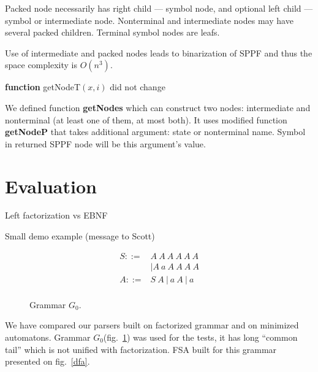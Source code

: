 \documentclass[runningheads,a4paper]{llncs}
\begin{document}
Packed node necessarily has right child --- symbol node, and optional left child --- symbol or intermediate node.
Nonterminal and intermediate nodes may have several packed children. 
Terminal symbol nodes are leafs.

Use of intermediate and packed nodes leads to binarization of SPPF and thus the space complexity is $O(n^{3})$.



\textbf{function} getNodeT$(x,i)$ did not change

We defined function \textbf{getNodes} which can construct two nodes: intermediate and nonterminal (at least one of them, at most both).
It uses modified function \textbf{getNodeP} that takes additional argument: state or nonterminal name. Symbol in returned SPPF node will be this argument's value.



\section{Evaluation}

Left factorization vs EBNF

Small demo example (message to Scott)

\begin{figure}[h]
$$
\begin{array}{crcl}
S ::=& A\ A\ A\ A\ A\ A \\
     &|A\ a\ A\ A\ A\ A \\
A ::=& S\ A\ |\ a\ A\ |\ a \\
\end{array}
$$
\caption{Grammar $G_0$.}
\label{testGrammar}
\end{figure}

We have compared our parsers built on factorized grammar and on minimized automatons.
Grammar $G_0$(fig.~\ref{testGrammar}) was used for the tests,
it has long ``common tail'' which is not unified with factorization.
FSA built for this grammar presented on fig.~\ref{dfa}.
\end{document}
